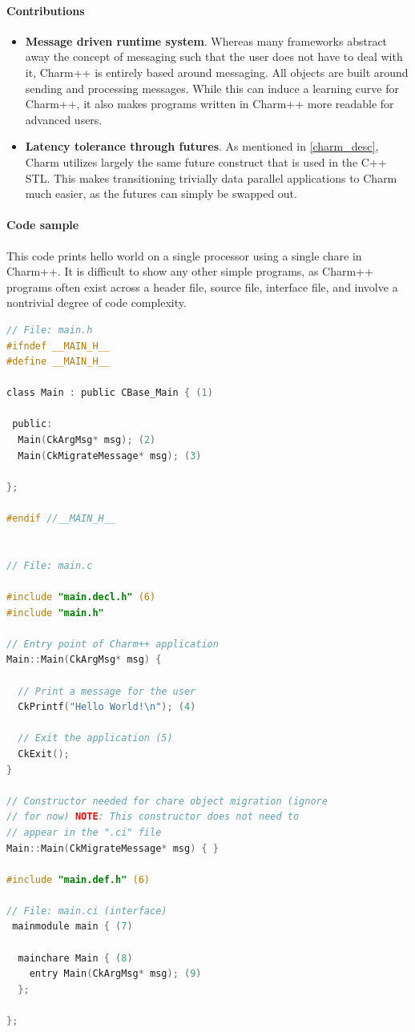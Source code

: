 \paragraph{Contributions}
	\begin{itemize}
		\item \textbf{Message driven runtime system}. Whereas many frameworks abstract away the concept of messaging such that the user does not have to deal with it, Charm++ is entirely based around messaging. All objects are built around sending and processing messages. While this can induce a learning curve for Charm++, it also makes programs written in Charm++ more readable for advanced users.  
		\item \textbf{Latency tolerance through futures}. As mentioned in \ref{charm_desc}, Charm utilizes largely the same future construct that is used in the C++ STL. This makes transitioning trivially data parallel applications to Charm much easier, as the futures can simply be swapped out.   
		
	\end{itemize}

\paragraph{Code sample}
This code prints hello world on a single processor using a single chare in Charm++. It is difficult to show any other simple programs, as Charm++ programs often exist across a header file, source file, interface file, and involve a nontrivial degree of code complexity.
\scriptsize
\begin{lstlisting}[language=C, caption=Hello World in Charm++ from \cite{charm_tutorial}, captionpos=b]
// File: main.h
#ifndef __MAIN_H__
#define __MAIN_H__

class Main : public CBase_Main { (1)

 public:
  Main(CkArgMsg* msg); (2)
  Main(CkMigrateMessage* msg); (3)

};

#endif //__MAIN_H__


// File: main.c

#include "main.decl.h" (6)
#include "main.h"

// Entry point of Charm++ application
Main::Main(CkArgMsg* msg) {

  // Print a message for the user
  CkPrintf("Hello World!\n"); (4)

  // Exit the application (5)
  CkExit();
}

// Constructor needed for chare object migration (ignore
// for now) NOTE: This constructor does not need to
// appear in the ".ci" file
Main::Main(CkMigrateMessage* msg) { }

#include "main.def.h" (6)
	
// File: main.ci (interface)
 mainmodule main { (7)

  mainchare Main { (8)
    entry Main(CkArgMsg* msg); (9)
  };

};

\end{lstlisting}%


